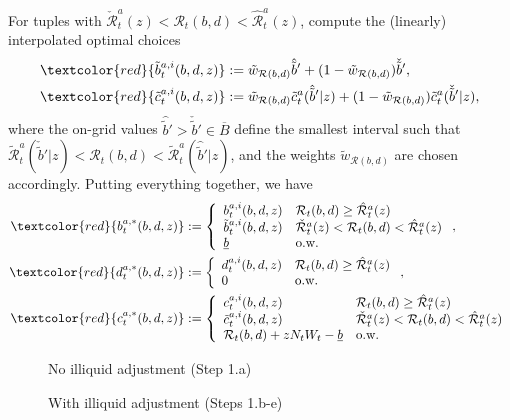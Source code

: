 \documentclass[11pt]{article} %
\begin{document}
\begin{enumerate}[a.)]
For tuples with $\check{\mathcal{R}}_t^a(z) < \mathcal{R}_t(b,d) < \hat{\mathcal{R}}_t^a(z)$, compute the (linearly) interpolated optimal choices
\begin{align}
\textcolor{red}{\tilde{b}_t^{a,i}(b,d,z)} &:= \tilde{w}_{\mathcal{R}(b,d)}\hat{\tilde{b}}' + (1-\tilde{w}_{\mathcal{R}(b,d)})\check{\tilde{b}}',\\
\textcolor{red}{\tilde{c}_t^{a,i}(b,d,z)} &:= \tilde{w}_{\mathcal{R}(b,d)}\tilde{c}^a_t(\hat{\tilde{b}}'|z) + (1-\tilde{w}_{\mathcal{R}(b,d)})\tilde{c}^a_t(\check{\tilde{b}}'|z),
\end{align}
where the on-grid values $\hat{\tilde{b}}' > \check{\tilde{b}}'\in\overline{B}$ define the smallest interval such that $\tilde{\mathcal{R}}^a_t(\check{\tilde{b}}'|z) < \mathcal{R}_t(b,d) < \tilde{\mathcal{R}}^a_t(\hat{\tilde{b}}'|z)$, and the weights $\tilde{w}_{\mathcal{R}(b,d)}$ are chosen accordingly. Putting everything together, we have
\begin{align}
\textcolor{red}{b_t^{a,*}(b,d,z)} &:= \left\{ \begin{array}{ll} b^{a,i}_t(b,d,z) & \mathcal{R}_t(b,d) \geq \hat{\mathcal{R}}^a_t(z) \\ \tilde{b}^{a,i}_t(b,d,z) &  \check{\mathcal{R}}^a_t(z) < \mathcal{R}_t(b,d) < \hat{\mathcal{R}}^a_t(z) \\ \underline{b} & \text{o.w.} \end{array}  \right., \\
\textcolor{red}{d_t^{a,*}(b,d,z)} &:= \left\{ \begin{array}{ll} d^{a,i}_t(b,d,z) &\mathcal{R}_t(b,d) \geq \hat{\mathcal{R}}^a_t(z) \\ 0 & \text{o.w.} \end{array}  \right., \\
\textcolor{red}{c_t^{a,*}(b,d,z)} &:= \left\{ \begin{array}{ll} c^{a,i}_t(b,d,z) & \mathcal{R}_t(b,d) \geq \hat{\mathcal{R}}^a_t(z) \\ \tilde{c}^{a,i}_t(b,d,z) &  \check{\mathcal{R}}^a_t(z) < \mathcal{R}_t(b,d) < \hat{\mathcal{R}}^a_t(z) \\ \mathcal{R}_t(b,d) + zN_tW_t - \underline{b} & \text{o.w.} \end{array}  \right. 
\end{align}
\end{enumerate}
\begin{figure}
\centering
\caption{No illiquid adjustment (Step 1.a)}
\end{figure}
\begin{figure}
\centering
\caption{With illiquid adjustment (Steps 1.b-e)}
\end{figure}
\newpage
\end{document}
